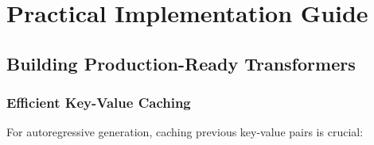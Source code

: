 
\section{Practical Implementation Guide}

\subsection{Building Production-Ready Transformers}

\subsubsection{Efficient Key-Value Caching}

For autoregressive generation, caching previous key-value pairs is crucial:

